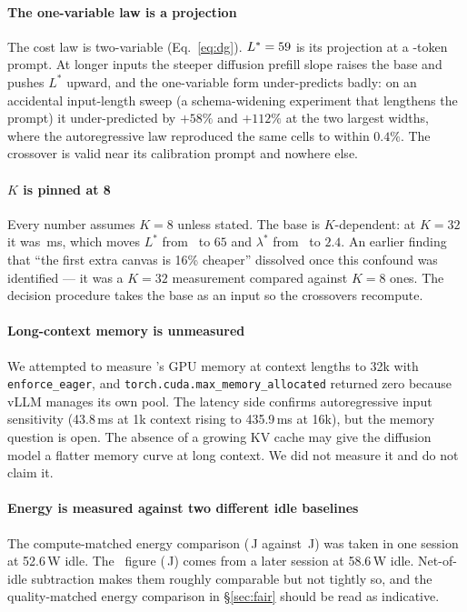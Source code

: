 \paragraph{The one-variable law is a projection}
The cost law is two-variable (Eq.~\ref{eq:dg}). $L^{*} = 59$ is its
projection at a -token prompt. At longer inputs the steeper
diffusion prefill slope raises the base and pushes $L^{*}$ upward, and the
one-variable form under-predicts badly: on an accidental input-length sweep
(a schema-widening experiment that lengthens the prompt) it under-predicted by
$+58\%$ and $+112\%$ at the two largest widths, where the autoregressive law
reproduced the same cells to within $0.4\%$. The crossover is valid near its
calibration prompt and nowhere else.

\paragraph{$K$ is pinned at 8}
Every number assumes $K{=}8$ unless stated. The base is $K$-dependent: at
$K{=}32$ it was \dgOldBase\,ms, which moves $L^{*}$ from \crossoverL\ to $65$
and $\lambda^{*}$ from \crossoverLambda\ to $2.4$. An earlier finding that
``the first extra canvas is 16\% cheaper'' dissolved once this confound was
identified --- it was a $K{=}32$ measurement compared against $K{=}8$ ones.
The decision procedure takes the base as an input so the crossovers recompute.

\paragraph{Long-context memory is unmeasured}
We attempted to measure \ARoneb's GPU memory at context lengths to 32k with
\texttt{enforce\_eager}, and \texttt{torch.cuda.max\_memory\_allocated}
returned zero because vLLM manages its own pool. The latency side confirms
autoregressive input sensitivity (43.8\,ms at 1k context rising to 435.9\,ms
at 16k), but the memory question is open. The absence of a growing KV cache
may give the diffusion model a flatter memory curve at long context. We did
not measure it and do not claim it.

\paragraph{Energy is measured against two different idle baselines}
The compute-matched energy comparison (\arThreeEnergy\,J against
\dgEnergy\,J) was taken in one session at 52.6\,W idle. The \ARoneb\ figure
(\arOneFiveEnergy\,J) comes from a later session at 58.6\,W idle. Net-of-idle
subtraction makes them roughly comparable but not tightly so, and the
quality-matched energy comparison in \S\ref{sec:fair} should be read as
indicative.

